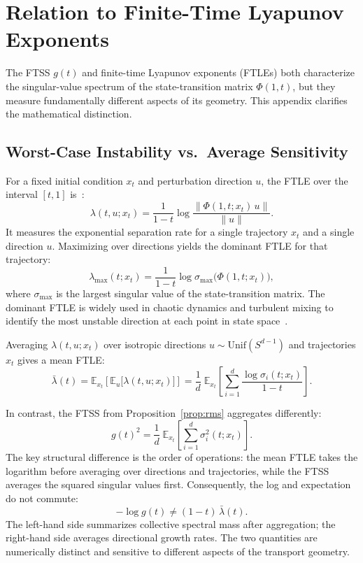 \documentclass[11pt]{article}
\begin{document}
\section{Relation to Finite-Time Lyapunov Exponents}
\label{app:lyapunov}

The FTSS $g(t)$ and finite-time Lyapunov exponents (FTLEs) both characterize 
the singular-value spectrum of the state-transition matrix $\Phi(1,t)$, but 
they measure fundamentally different aspects of its geometry. This appendix 
clarifies the mathematical distinction.

\subsection{Worst-Case Instability vs.\ Average Sensitivity}

For a fixed initial condition $x_t$ and perturbation direction $u$, the 
FTLE over the interval $[t,1]$ is~\cite{shadden2005definition}:
\begin{equation}
\lambda(t, u; x_t) = \frac{1}{1-t}\log\frac{\|\Phi(1,t;x_t)\,u\|}{\|u\|}.
\end{equation}
It measures the exponential separation rate for a single trajectory $x_t$ and 
a single direction $u$. Maximizing over directions yields the dominant FTLE 
for that trajectory:
\begin{equation}
\lambda_{\max}(t; x_t) = \frac{1}{1-t}\log\sigma_{\max}\bigl(\Phi(1,t;x_t)\bigr),
\end{equation}
where $\sigma_{\max}$ is the largest singular value of the state-transition 
matrix. The dominant FTLE is widely used in chaotic dynamics and turbulent 
mixing to identify the most unstable direction at each point in state 
space~\cite{haller2015lagrangian}.

Averaging $\lambda(t,u;x_t)$ over isotropic directions $u \sim \mathrm{Unif}(S^{d-1})$ 
and trajectories $x_t$ gives a mean FTLE:
\begin{equation}
\bar{\lambda}(t) = \mathbb{E}_{x_t}\!\left[\mathbb{E}_{u}\bigl[\lambda(t,u;x_t)\bigr]\right]
= \frac{1}{d}\;\mathbb{E}_{x_t}\!\left[\sum_{i=1}^{d} \frac{\log\sigma_i(t;x_t)}{1-t}\right].
\end{equation}

In contrast, the FTSS from Proposition~\ref{prop:rms} aggregates differently:
\begin{equation}
g(t)^2 = \frac{1}{d}\;\mathbb{E}_{x_t}\!\left[\sum_{i=1}^{d} \sigma_i^2(t;x_t)\right].
\end{equation}
The key structural difference is the order of operations: the mean FTLE takes 
the logarithm before averaging over directions and trajectories, while the 
FTSS averages the squared singular values first. Consequently, the log and 
expectation do not commute:
\begin{equation}
-\log g(t) \neq (1-t)\,\bar{\lambda}(t).
\end{equation}
The left-hand side summarizes collective spectral mass after aggregation; the 
right-hand side averages directional growth rates. The two quantities are 
numerically distinct and sensitive to different aspects of the transport 
geometry.
\end{document}
